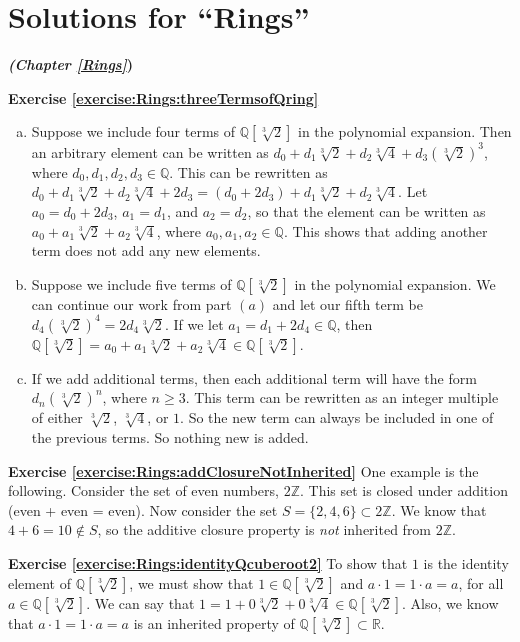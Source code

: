 
\section{Solutions for ``Rings''}
\label{sec:AnswerKey:Rings}
\noindent\textbf{\textit{ (Chapter \ref{Rings}})}\bigskip

\noindent\textbf{Exercise \ref{exercise:Rings:threeTermsofQring}}
\begin{enumerate}[(a)]
\item Suppose we include four terms of ${\mathbb Q}[\sqrt[3]{2}]$ in the polynomial expansion.  Then an arbitrary element can be written as $d_0+d_1\sqrt[3]{2}+d_2\sqrt[3]{4}+d_3(\sqrt[3]{2})^3$, where $d_0,d_1,d_2,d_3\in{\mathbb Q}$. This can be rewritten as $d_0+d_1\sqrt[3]{2}+d_2\sqrt[3]{4}+2d_3=(d_0+2d_3)+d_1\sqrt[3]{2}+d_2\sqrt[3]{4}$.  Let $a_0=d_0+2d_3$, $a_1=d_1$, and $a_2=d_2$, so that the element can be written as $a_0+a_1\sqrt[3]{2}+a_2\sqrt[3]{4}$, where $a_0,a_1,a_2\in {\mathbb Q}$.  This shows that adding another term does not add any new elements.
\item Suppose we include five terms of ${\mathbb Q}[\sqrt[3]{2}]$ in the polynomial expansion.  We can continue our work from part $(a)$ and let our fifth term be $d_4(\sqrt[3]{2})^4=2d_4\sqrt[3]{2}$.  If we let $a_1=d_1+2d_4\in{\mathbb Q}$, then ${\mathbb Q}[\sqrt[3]{2}]=a_0+a_1\sqrt[3]{2}+a_2\sqrt[3]{4}\in{\mathbb Q}[\sqrt[3]{2}]$.
\item If we add additional terms, then each additional term will have the form $d_n(\sqrt[3]{2})^n$, where $n\ge 3$.  This term can be rewritten as an integer multiple of either $\sqrt[3]{2}$, $\sqrt[3]{4}$, or $1$.  So the new term can always be included in one of the previous terms. So nothing new is added.
\end{enumerate}

\noindent\textbf{Exercise \ref{exercise:Rings:addClosureNotInherited}}
One example is the following. Consider the set of even numbers, $2{\mathbb Z}$.  This set is closed under addition (even + even = even).  Now consider the set $S=\{2,4,6\}\subset 2{\mathbb Z}$.  We know that $4+6=10\notin S$, so the additive closure property is \emph{not} inherited from $2{\mathbb Z}$.

\noindent\textbf{Exercise \ref{exercise:Rings:identityQcuberoot2}}
To show that $1$ is the identity element of ${\mathbb Q}[\sqrt[3]{2}]$, we must show that $1\in{\mathbb Q}[\sqrt[3]{2}]$ and $a\cdot 1=1\cdot a=a$, for all $a\in{\mathbb Q}[\sqrt[3]{2}]$. We can say that $1=1+0\sqrt[3]{2}+0\sqrt[3]{4}\in{\mathbb Q}[\sqrt[3]{2}]$. Also, we know that  $a\cdot1=1\cdot a=a$ is an inherited property of ${\mathbb Q}[\sqrt[3]{2}]\subset{\mathbb R}$.

